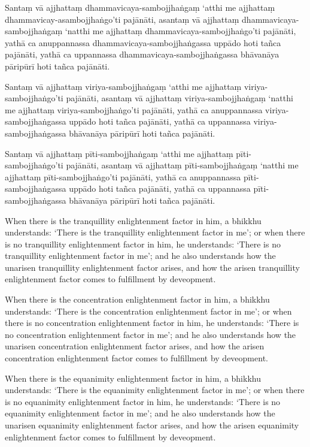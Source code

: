 Santaṃ vā ajjhattaṃ dhammavicaya-sambojjhaṅgaṃ ‘atthi me ajjhattaṃ dhammavicay-asambojjhaṅgo’ti pajānāti,
asantaṃ vā ajjhattaṃ dhammavicaya-sambojjhaṅgaṃ ‘natthi me ajjhattaṃ dhammavicaya-sambojjhaṅgo’ti pajānāti,
yathā ca anuppannassa dhammavicaya-sambojjhaṅgassa uppādo hoti tañca pajānāti,
yathā ca uppannassa dhammavicaya-sambojjhaṅgassa bhāvanāya pāripūrī hoti tañca pajānāti.

Santaṃ vā ajjhattaṃ viriya-sambojjhaṅgaṃ ‘atthi me ajjhattaṃ viriya-sambojjhaṅgo’ti pajānāti,
asantaṃ vā ajjhattaṃ viriya-sambojjhaṅgaṃ ‘natthi me ajjhattaṃ viriya-sambojjhaṅgo’ti pajānāti,
yathā ca anuppannassa viriya-sambojjhaṅgassa uppādo hoti tañca pajānāti,
yathā ca uppannassa viriya-sambojjhaṅgassa bhāvanāya pāripūrī hoti tañca pajānāti.

Santaṃ vā ajjhattaṃ pīti-sambojjhaṅgaṃ ‘atthi me ajjhattaṃ pīti-sambojjhaṅgo’ti pajānāti,
asantaṃ vā ajjhattaṃ pīti-sambojjhaṅgaṃ ‘natthi me ajjhattaṃ pīti-sambojjhaṅgo’ti pajānāti,
yathā ca anuppannassa pīti-sambojjhaṅgassa uppādo hoti tañca pajānāti,
yathā ca uppannassa pīti-sambojjhaṅgassa bhāvanāya pāripūrī hoti tañca pajānāti.

\englishPage

When there is the tranquillity enlightenment factor in him, a bhikkhu
understands: `There is the tranquillity enlightenment factor in me'; or when
there is no tranquillity enlightenment factor in him, he understands: `There is
no tranquillity enlightenment factor in me'; and he also understands how the
unarisen tranquillity enlightenment factor arises, and how the arisen
tranquillity enlightenment factor comes to fulfillment by deveopment.

When there is the concentration enlightenment factor in him, a bhikkhu
understands: `There is the concentration enlightenment factor in me'; or when
there is no concentration enlightenment factor in him, he understands: `There is
no concentration enlightenment factor in me'; and he also understands how the
unarisen concentration enlightenment factor arises, and how the arisen
concentration enlightenment factor comes to fulfillment by deveopment.

When there is the equanimity enlightenment factor in him, a bhikkhu understands:
`There is the equanimity enlightenment factor in me'; or when there is no
equanimity enlightenment factor in him, he understands: `There is no equanimity
enlightenment factor in me'; and he also understands how the unarisen equanimity
enlightenment factor arises, and how the arisen equanimity enlightenment factor
comes to fulfillment by deveopment.

